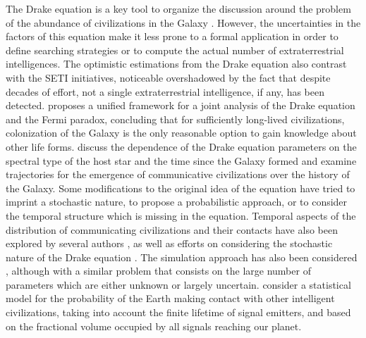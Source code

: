 \Fpagebreak
%
The Drake equation is a key tool to organize the discussion around the
problem of the abundance of civilizations in the Galaxy
\citep{hinkel_interdisciplinary_2019}.
%
However, the uncertainties in the factors of this equation make it
less prone to a formal application in order to define searching
strategies or to compute the actual number of extraterrestrial
intelligences.
%
The optimistic estimations from the Drake equation also contrast with
the SETI initiatives, noticeable overshadowed by the fact that despite
decades of effort, not a single extraterrestrial intelligence, if any,
has been detected.
%
\citet{prantzos_joint_2013} proposes a unified framework for a joint
analysis of the Drake equation and the Fermi paradox, concluding that
for sufficiently long-lived civilizations, colonization of the Galaxy
is the only reasonable option to gain knowledge about other life
forms.
%
\citet{haqq-misra_drake_2017} discuss the dependence of the Drake
equation parameters on the spectral type of the host star and the time
since the Galaxy formed and examine trajectories for the emergence of
communicative civilizations over the history of the Galaxy.
%
Some modifications to the original idea of the equation have tried to
imprint a stochastic nature, to propose a probabilistic approach, or
to consider the temporal structure which is missing in the equation.
%
Temporal aspects of the distribution of communicating civilizations
and their contacts have also been explored by several authors
\citep{fogg_temporal_1987, forgan_spatiotemporal_2011,
balbi_impact_2018, balb_spatiotemporal_2018, horvat_impact_2011}, as
well as efforts on considering the stochastic nature of the Drake
equation \citep{glade_stochastic_2011}.
%
The simulation approach has also been considered
\citep{forgan_evaluating_2015, vukotic_grandeur_2016,
murante_simulating_2015, forgan_numerical_2009, forgan_galactic_2017,
ramirez_new_2017}, although with a similar problem that consists on
the large number of parameters which are either unknown or largely
uncertain.
%
\citet{grimaldi_signal_2017} consider a statistical model for the
probability of the Earth making contact with other intelligent
civilizations, taking into account the finite lifetime of signal
emitters, and based on the fractional volume occupied by all signals
reaching our planet.



